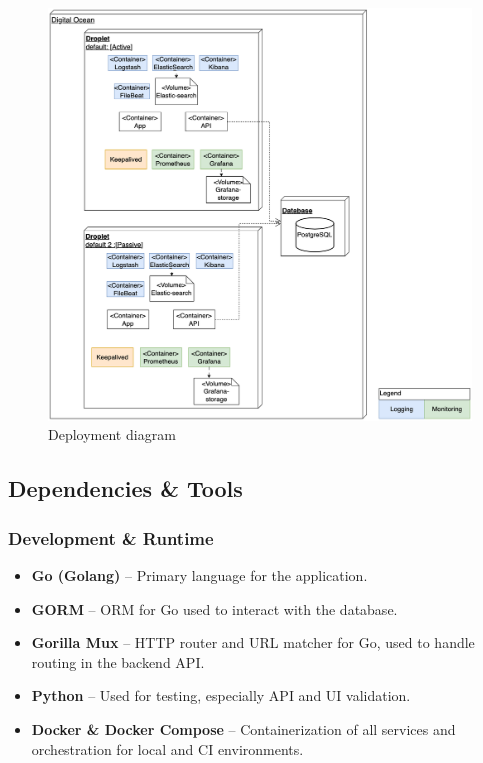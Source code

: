 \begin{figure}[!htb]
    \centering
    \includegraphics[width=0.9\linewidth]{Images/Deployment_diagram-Newer.drawio.png}
    \caption{Deployment diagram}
    \label{fig:Deployment}
\end{figure}


\subsection{Dependencies \& Tools}

\subsubsection*{Development \& Runtime}
\begin{itemize}
  \item \textbf{Go (Golang)} – Primary language for the application. 
  \item \textbf{GORM} – ORM for Go used to interact with the database.
  \item \textbf{Gorilla Mux} – HTTP router and URL matcher for Go, used to handle routing in the backend API.
  \item \textbf{Python} – Used for testing, especially API and UI validation.
  \item \textbf{Docker \& Docker Compose} – Containerization of all services and orchestration for local and CI environments.
\end{itemize}

